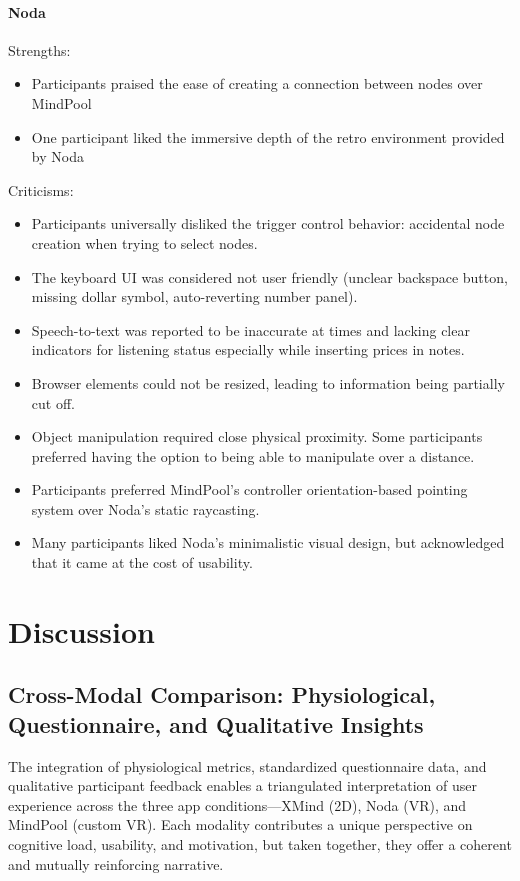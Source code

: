 \documentclass{CPP}
\begin{document}
\subsubsection{Noda}
  Strengths:
  \begin{itemize}
    \item Participants praised the ease of creating a connection between nodes over MindPool
    \item One participant liked the immersive depth of the retro environment provided by Noda 
    
    \end{itemize}
Criticisms:
\begin{itemize}
    \item Participants universally disliked the trigger control behavior: accidental node creation when trying to select nodes.
    \item The keyboard UI was considered not user friendly (unclear backspace button, missing dollar symbol, auto-reverting number panel).
    \item Speech-to-text was reported to be inaccurate at times and lacking clear indicators for listening status especially while inserting prices in notes.
    \item Browser elements could not be resized, leading to information being partially cut off.
    \item Object manipulation required close physical proximity. Some participants preferred having the option to being able to manipulate over a distance.
    \item Participants preferred MindPool’s controller orientation-based pointing system over Noda’s static raycasting.
    \item Many participants liked Noda’s minimalistic visual design, but acknowledged that it came at the cost of usability.
\end{itemize}



\newpage

\chapter{Discussion}

\section{Cross-Modal Comparison: Physiological, Questionnaire, and Qualitative Insights}

The integration of physiological metrics, standardized questionnaire data, and qualitative participant feedback enables a triangulated interpretation of user experience across the three app conditions—XMind (2D), Noda (VR), and MindPool (custom VR). Each modality contributes a unique perspective on cognitive load, usability, and motivation, but taken together, they offer a coherent and mutually reinforcing narrative.
\end{document}
